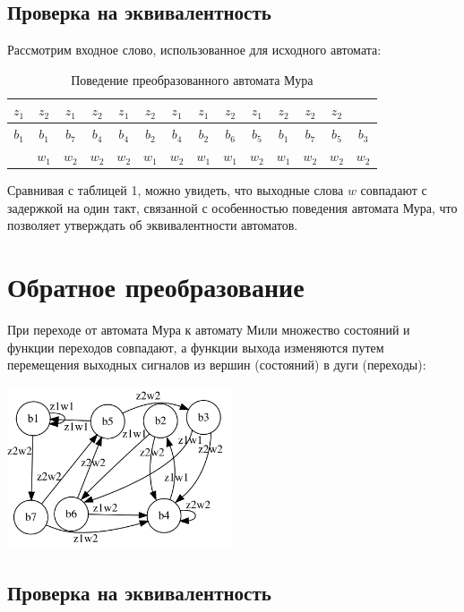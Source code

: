 \documentclass[listings]{labreport}
\begin{document}
\subsection*{Проверка на эквивалентность}

Рассмотрим входное слово, использованное для исходного автомата:

\begin{table}[h]
\begin{tabular}{|c|c|c|c|c|c|c|c|c|c|c|c|c|c|}
\hline
$z_1$ & $z_2$ & $z_1$ & $z_2$ & $z_1$ & $z_2$ & $z_1$ & $z_1$ & $z_2$ & $z_1$ & $z_2$ & $z_2$ & $z_2$ & \\\hline

$b_1$ & $b_1$ & $b_7$ & $b_4$ & $b_4$ & $b_2$ & $b_4$ & $b_2$ & $b_6$ & $b_5$ & $b_1$ & $b_7$ & $b_5$ & $b_3$ \\\hline

      & $w_1$ & $w_2$ & $w_2$ & $w_2$ & $w_1$ & $w_2$ & $w_1$ & $w_1$ & $w_2$ & $w_1$ & $w_2$ & $w_2$ & $w_2$ \\\hline
\end{tabular}
\caption{Поведение преобразованного автомата Мура}
\end{table}

Сравнивая с таблицей 1, можно увидеть, что выходные слова $w$ совпадают с задержкой на один такт, связанной с особенностью поведения автомата Мура, что позволяет утверждать об эквивалентности автоматов.

\section*{Обратное преобразование}

При переходе от автомата Мура к автомату Мили множество состояний и функции переходов совпадают, а функции выхода изменяются путем перемещения выходных сигналов из вершин (состояний) в дуги (переходы): 

\includegraphics[width=0.5\textwidth]{mealy.png}

\subsection*{Проверка на эквивалентность}
\end{document}
